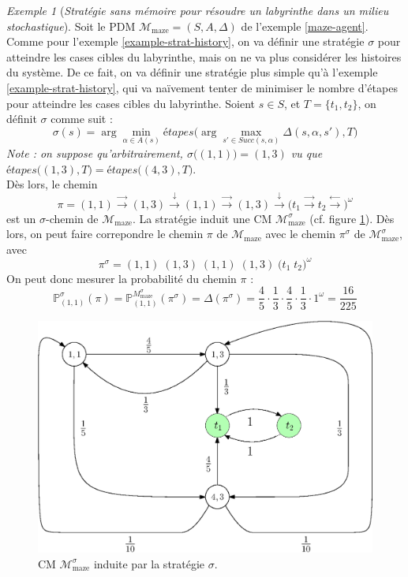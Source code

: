 \documentclass[12pt,a4paper]{report}
\theoremstyle{definition}%
\theoremstyle{remark}
\newtheorem{example}{Exemple}[chapter]
\newcommand{\pr}{\mathbb{P}}
\begin{document}
\begin{example}[\textit{Stratégie sans mémoire pour résoudre un labyrinthe
dans un milieu stochastique}]
	Soit le PDM $\mathcal{M}_{\text{maze}} = (S, A, \Delta)$ de l'exemple
	\ref{maze-agent}.
	Comme pour l'exemple \ref{example-strat-history}, on va définir une stratégie
	$\sigma$ pour atteindre les cases cibles du labyrinthe, mais on ne va
	plus considérer les histoires du système.
	De ce fait, on va définir une stratégie plus simple qu'à l'exemple
	\ref{example-strat-history}, qui va naïvement tenter de minimiser le nombre
	d'étapes pour atteindre les cases cibles du labyrinthe.
	Soient $s \in S$, et $T = \{t_1, t_2 \}$, on définit $\sigma$ comme
	suit :
	\[
		\sigma(s) = \arg \min_{\alpha \in A(s)} \textit{étapes}\big(
			\arg \max_{s' \in Succ(s, \alpha)} \Delta(s, \alpha, s'), T\big)
	\]
	\textit{Note : on suppose qu'arbitrairement,
	$\sigma\big((1, 1)\big) = (1, 3)$ vu que $\textit{étapes}\big((1, 3), T\big)
	= \textit{étapes}\big((4, 3), T\big)$}.\\
	Dès lors, le chemin
	\[
		\pi = (1, 1) \xrightarrow{\rightarrow} (1, 3) \xrightarrow{\downarrow} (1, 1) \xrightarrow{\rightarrow} (1, 3) \xrightarrow{\downarrow}
		\big(t_1 \xrightarrow{\rightarrow} t_2
		\xrightarrow{\leftarrow} \big)^\omega
	\]
	est un $\sigma$-chemin de $\mathcal{M}_{\text{maze}}$. La stratégie
	induit une CM $\mathcal{M}_{\text{maze}}^\sigma$ (cf. figure
	\ref{CM-induite-strat-2}).
	Dès lors, on peut faire correpondre le chemin $\pi$ de
	$\mathcal{M}_{\text{maze}}$ avec le chemin $\pi^\sigma$
	de $\mathcal{M}_{\text{maze}}^\sigma$, avec
	\[
		\pi^\sigma = (1, 1) \; (1, 3) \; (1, 1) \; (1, 3) \; \big( t_1 \; t_2 \big)^\omega
	\]
	On peut donc mesurer la probabilité du chemin $\pi$ :
	\[
		\pr^\sigma_{(1, 1)}(\pi) =
		 \pr^{{M}_{\text{maze}}^\sigma}_{(1,1)}(\pi^\sigma)
		 = \Delta(\pi^\sigma) = \frac{4}{5} \cdot \frac{1}{3} \cdot \frac{4}{5} \cdot \frac{1}{3} \cdot 1^\omega = \frac{16}{225}
	\]
	\begin{figure}[H]
		\centering
		\captionsetup{justification=centering}
		\includegraphics[scale=0.5]{figures/maze-PDM-inducted-S}
		\caption{CM $\mathcal{M}_{\text{maze}}^\sigma$ induite par la stratégie $\sigma$.}
		\label{CM-induite-strat-2}
	\end{figure}


\end{example}
\end{document}
